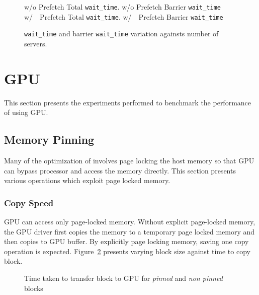\begin{figure}[h]
  
   w/o Prefetch Total \texttt{wait\_time}.
   w/o Prefetch Barrier \texttt{wait\_time}
  \\
   w/~~Prefetch Total \texttt{wait\_time}.
    w/~~Prefetch Barrier \texttt{wait\_time}
  \caption{\texttt{wait\_time} and barrier \texttt{wait\_time} variation againsts number of servers.}
  \label{fig:prefetch_real_barrier}
\end{figure}
\section{GPU}
This section presents the experiments performed to benchmark the performance of
using GPU.
\subsection{Memory Pinning}
Many of the optimization of involves page locking the host memory so that GPU can
bypass processor and access the memory directly. This section presents various
operations which exploit page locked memory.
\subsubsection{Copy Speed}
GPU can access only page-locked memory. Without explicit page-locked memory, the
GPU driver first copies the memory to a temporary page locked memory and then copies
to GPU buffer. By explicitly page locking memory, saving one copy operation is expected.
Figure~\ref{fig:mempin_block_copy} presents varying block size against time to
copy block.

\begin{figure}[h]
  
  \caption{Time taken to transfer block to GPU for \textit{pinned} and \textit{non pinned} blocks}
  \label{fig:mempin_block_copy}
\end{figure}

